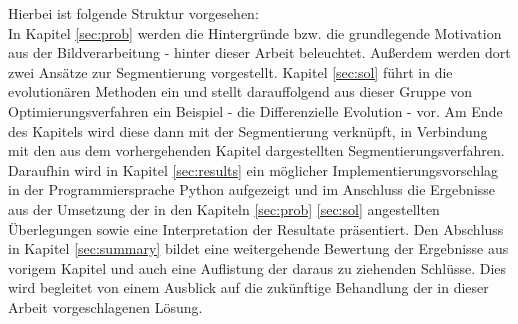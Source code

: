 	Hierbei ist folgende Struktur vorgesehen: \\
	In Kapitel \ref{sec:prob} werden die Hintergründe bzw. die grundlegende 
	Motivation aus der Bildverarbeitung - hinter dieser Arbeit beleuchtet. Außerdem werden dort zwei Ansätze zur Segmentierung vorgestellt.
	Kapitel \ref{sec:sol} führt in die evolutionären Methoden ein und stellt darauffolgend aus dieser Gruppe von Optimierungsverfahren ein Beispiel - die Differenzielle Evolution - vor. Am Ende des Kapitels wird diese dann mit der Segmentierung verknüpft, in Verbindung mit den aus dem vorhergehenden Kapitel dargestellten Segmentierungsverfahren.
	Daraufhin wird in Kapitel \ref{sec:results} ein möglicher Implementierungsvorschlag in der Programmiersprache Python aufgezeigt und im Anschluss die Ergebnisse aus der Umsetzung der in den Kapiteln \ref{sec:prob} \ref{sec:sol} angestellten Überlegungen sowie eine Interpretation der Resultate präsentiert.
	Den Abschluss in Kapitel \ref{sec:summary} bildet eine weitergehende Bewertung der Ergebnisse aus vorigem Kapitel und auch eine Auflistung der daraus zu ziehenden Schlüsse. Dies wird begleitet von einem Ausblick auf die zukünftige Behandlung der in dieser Arbeit vorgeschlagenen Lösung.
